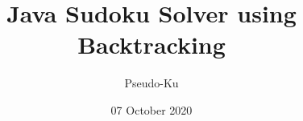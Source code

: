 \documentclass{article}
\author{Pseudo-Ku}
\title{Java Sudoku Solver using Backtracking}
\date{07 October 2020}
\begin{document}
    \begin{titlepage}
        \maketitle{}
    \end{titlepage}
    
    \tableofcontents
\end{document}
